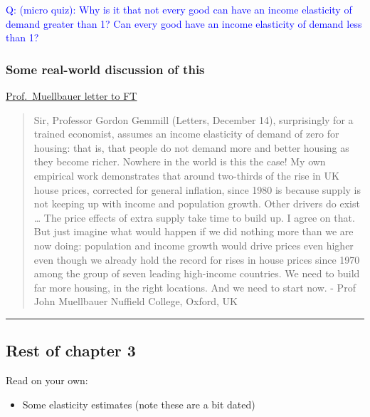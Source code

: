 \documentclass[]{article}
\providecommand{\tightlist}{%
  \setlength{\itemsep}{0pt}\setlength{\parskip}{0pt}}
\begin{document}
\bigskip

\textcolor{blue}{Q:  (micro quiz): Why is it that not every good can have an income elasticity of demand greater than 1?
 Can every good have an income elasticity of demand less than 1?}

\hypertarget{some-real-world-discussion-of-this}{%
\subsubsection{Some real-world discussion of
this}\label{some-real-world-discussion-of-this}}

\href{https://www.ft.com/content/4ea79d96-a4d6-11e5-a91e-162b86790c58}{Prof.~Muellbauer
letter to FT}

\begin{quote}
Sir, Professor Gordon Gemmill (Letters, December 14), surprisingly for a
trained economist, assumes an income elasticity of demand of zero for
housing: that is, that people do not demand more and better housing as
they become richer. Nowhere in the world is this the case! My own
empirical work demonstrates that around two-thirds of the rise in UK
house prices, corrected for general inflation, since 1980 is because
supply is not keeping up with income and population growth. Other
drivers do exist \ldots{} The price effects of extra supply take time to
build up. I agree on that. But just imagine what would happen if we did
nothing more than we are now doing: population and income growth would
drive prices even higher even though we already hold the record for
rises in house prices since 1970 among the group of seven leading
high-income countries. We need to build far more housing, in the right
locations. And we need to start now. - Prof John Muellbauer Nuffield
College, Oxford, UK
\end{quote}

\begin{center}\rule{0.5\linewidth}{\linethickness}\end{center}

\hypertarget{rest-of-chapter-3}{%
\subsection{Rest of chapter 3}\label{rest-of-chapter-3}}

Read on your own:

\begin{itemize}
\tightlist
\item
  Some elasticity estimates (note these are a bit dated)
\end{itemize}
\end{document}
